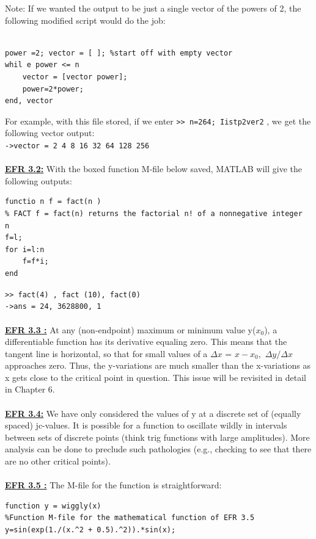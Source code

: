 \documentclass[../main.tex]{subfiles}
\begin{document}
Note: If we wanted the output to be just a single vector of the powers of 2, the following modified 
script would do the job: 
\\
\\
\begin{lstlisting}[numbers=none,frame=none]
% script file for EFR 3.1: Iistp2ver2 
power =2; vector = [ ]; %start off with empty vector 
whil e power <= n 
	vector = [vector power]; 
	power=2*power; 
end, vector
\end{lstlisting}
For example, with this file stored, if we enter \texttt{>> n=264; Iistp2ver2} , we get the following 
vector output:\\
\texttt{->vector = 2 4 8 16 32 64 128 256 }\\
\\
\textbf{\underline{EFR 3.2:}} With the boxed function M-file below saved, MATLAB will give the following outputs:
\begin{lstlisting}[numbers=none]
functio n f = fact(n ) 
% FACT f = fact(n) returns the factorial n! of a nonnegative integer 
n 
f=l; 
for i=l:n 
	f=f*i; 
end 
\end{lstlisting}
\texttt{>> fact(4) , fact (10), fact(0)}\\
\texttt{->ans = 24, 3628800, 1 }
\\
\\
\textbf{\underline{EFR 3.3 :}} At any (non-endpoint) maximum or minimum value y($x_0$), a differentiable function has 
its derivative equaling zero. This means that the tangent line is horizontal, so that for small values of a $ \Delta{x}$ = $x-x_0,$ $\Delta{y}/\Delta{x}$ approaches zero. Thus, the y-variations are much smaller than the x-variations as x gets close to the critical point in question. This issue will be revisited in detail in Chapter 6. 
\\
\\
\textbf{\underline{EFR 3.4:}} We have only considered the values of y at a discrete set of (equally spaced) jc-values. It 
is possible for a function to oscillate wildly in intervals between sets of discrete points (think trig 
functions with large amplitudes). More analysis can be done to preclude such pathologies (e.g., 
checking to see that there are no other critical points).
\\
\\
\textbf{\underline{EFR 3.5 :}} The M-file for the function is straightforward:
\begin{lstlisting}[numbers=none]
function y = wiggly(x) 
%Function M-file for the mathematical function of EFR 3.5 
y=sin(exp(1./(x.^2 + 0.5).^2)).*sin(x);
\end{lstlisting}
\end{document}
